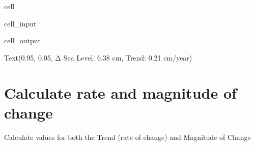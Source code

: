 \documentclass[letterpaper,10pt,english]{jupyterBook}
\begin{document}
\begin{sphinxuseclass}{cell}
\begin{sphinxVerbatimInput}
\begin{sphinxuseclass}{cell_input}
\end{sphinxuseclass}\end{sphinxVerbatimInput}
\begin{sphinxVerbatimOutput}

\begin{sphinxuseclass}{cell_output}
\begin{sphinxVerbatim}[commandchars=\\\{\}]
Text(0.95, 0.05, \PYGZsq{}Δ Sea Level: 6.38 cm, Trend: 0.21 cm/year\PYGZsq{})
\end{sphinxVerbatim}

\noindent{}

\end{sphinxuseclass}\end{sphinxVerbatimOutput}

\end{sphinxuseclass}

\section{Calculate rate and magnitude of change}
\label{\detokenize{notebooks/regional_and_local/SL_Trend:calculate-rate-and-magnitude-of-change}}
\sphinxAtStartPar
Calculate values for both the Trend (rate of change) and Magnitude of Change
\end{document}
